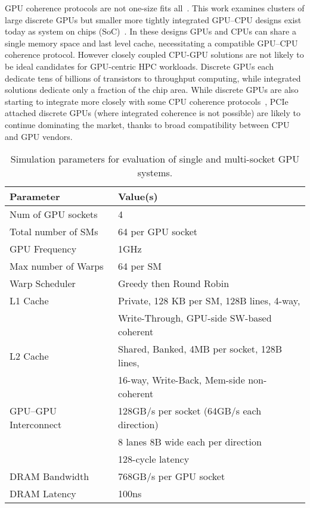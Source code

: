GPU coherence protocols are not one-size fits all~\cite{sinclair2015efficient, Power2013, ZiabariTACO-16}.  
This work examines clusters 
of large discrete GPUs but smaller
more tightly integrated GPU--CPU designs exist today as system on chips (SoC)~\cite{AMDCARRIZO,INTELSKYLAKEINTEGRATED}.
In these designs GPUs and CPUs can share a single memory space and
last level cache, necessitating a compatible GPU--CPU coherence protocol. 
However closely coupled CPU-GPU solutions are not likely to be ideal
candidates for GPU-centric HPC workloads.  Discrete GPUs each dedicate tens of billions of transistors 
to throughput computing, while integrated solutions dedicate only a fraction of the
chip area. While discrete GPUs are also starting to integrate more closely with 
some CPU coherence protocols~\cite{agarwal2016selective,ZiabariTACO-16},
PCIe attached discrete GPUs (where integrated coherence
is not possible) are likely to continue dominating the market, thanks to broad 
compatibility between CPU and GPU vendors.

\begin{table}[tp]
\begin{small}
\centering
\begin{tabular}{ll}
\toprule
\textbf{Parameter} & \textbf{Value(s)} \\
\toprule
Num of GPU sockets & 4 \\
\midrule
Total number of SMs & 64 per GPU socket \\
\midrule
GPU Frequency & 1GHz \\
\midrule
Max number of Warps & 64 per SM \\
\midrule
Warp Scheduler & Greedy then Round Robin \\
\midrule
L1 Cache & Private, 128 KB per SM, 128B lines, 4-way, \\ 
& Write-Through, GPU-side SW-based coherent \\
\midrule
L2 Cache & Shared, Banked, 4MB per socket, 128B lines,  \\ 
& 16-way, Write-Back, Mem-side non-coherent\\
\midrule
GPU--GPU Interconnect & 128GB/s per socket (64GB/s each direction) \\
& 8 lanes 8B wide each per direction \\
&128-cycle latency \\
\midrule
DRAM Bandwidth & 768GB/s per GPU socket\\
\midrule
DRAM Latency & 100ns \\
\toprule
\end{tabular}
\vspace{-.1in}
\caption{Simulation parameters for evaluation of single and multi-socket GPU 
systems.}
\vspace{-.3in}
\label{tab:setup}
\end{small}
\end{table} 

